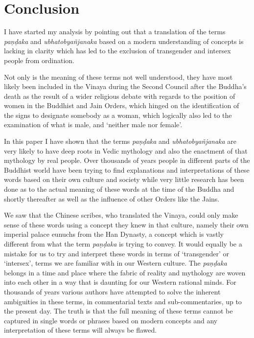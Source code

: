 \section{Conclusion}
I have started my analysis by pointing out that a translation of the terms {\em paṇḍaka} and {\em ubhatob­yañ­janaka} based on a modern understanding of concepts is lacking in clarity which has led to the exclusion of transgender and intersex people from ordination.

Not only is the meaning of these terms not well understood, they have most likely been included in the Vinaya during the Second Council after the Buddha's death as the result of a wider religious debate with regards to the position of women in the Buddhist and Jain Orders, which hinged on the identification of the signs to designate somebody as a woman, which logically also led to the examination of what is male, and `neither male nor female'.

In this paper I have shown that the terms {\em paṇḍaka} and {\em ubhatob­yañ­janaka} are very likely to have deep roots in Vedic mythology and also the enactment of that mythology by real people. Over thousands of years people in different parts of the Buddhist world have been trying to find explanations and interpretations of these words based on their own culture and society while very little research has been done as to the actual meaning of these words at the time of the Buddha and shortly thereafter as well as the influence of other Orders like the Jains. 

We saw that the Chinese scribes, who translated the Vinaya, could only make sense of these words using a concept they knew in that culture, namely their own imperial palace eunuchs from the Han Dynasty, a concept which is vastly different from what the term {\em paṇḍaka} is trying to convey. It would equally be a mistake for us to try and interpret these words in terms of `transgender' or `intersex', terms we are familiar with in our Western culture. The {\em paṇḍaka} belongs in a time and place where the fabric of reality and mythology are woven into each other in a way that is daunting for our Western rational minds. For thousands of years various authors have attempted to solve the inherent ambiguities in these terms, in commentarial texts and sub-commentaries, up to the present day. The truth is that the full meaning of these terms cannot be captured in single words or phrases based on modern concepts and any interpretation of these terms will always be flawed.


